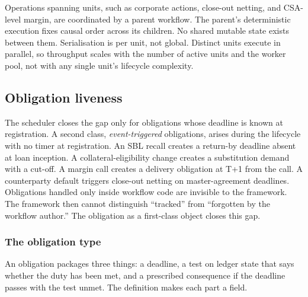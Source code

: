 Operations spanning units, such as corporate actions, close-out netting, and CSA-level margin, are coordinated by a parent workflow. The parent's deterministic execution fixes causal order across its children. No shared mutable state exists between them. Serialisation is per unit, not global. Distinct units execute in parallel, so throughput scales with the number of active units and the worker pool, not with any single unit's lifecycle complexity.

\subsection{Obligation liveness}
\label{sec:obligation-liveness}

The scheduler closes the gap only for obligations whose deadline is known at registration. A second class, \emph{event-triggered} obligations, arises during the lifecycle with no timer at registration. An SBL recall creates a return-by deadline absent at loan inception. A collateral-eligibility change creates a substitution demand with a cut-off. A margin call creates a delivery obligation at T+1 from the call. A counterparty default triggers close-out netting on master-agreement deadlines. Obligations handled only inside workflow code are invisible to the framework. The framework then cannot distinguish ``tracked'' from ``forgotten by the workflow author.'' The obligation as a first-class object closes this gap.

\subsubsection{The obligation type}
\label{sec:obligation-type}

An obligation packages three things: a deadline, a test on ledger state that says whether the duty has been met, and a prescribed consequence if the deadline passes with the test unmet. The definition makes each part a field.

